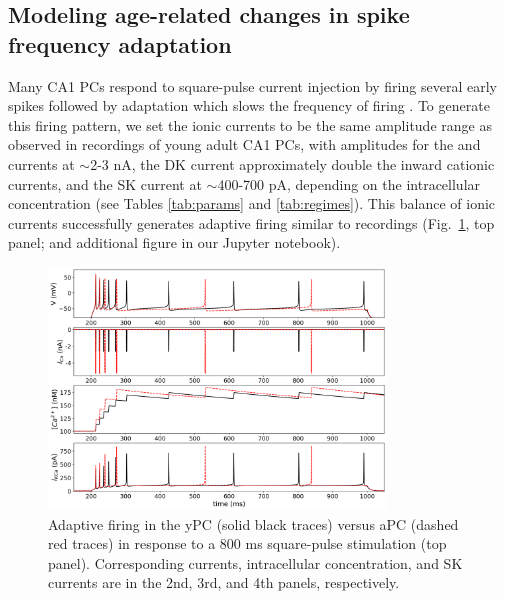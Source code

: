 \documentclass[12pt]{article}
\begin{document}
\subsection{Modeling age-related changes in spike frequency adaptation}
\label{sec:adaptation}

Many CA1 PCs respond to square-pulse current injection by firing several early spikes followed by adaptation which slows the frequency of firing \citep{gant2006early,gu2008sk,moyer1992nimodipine}. To generate this firing pattern, we set the ionic currents to be the same amplitude range as observed in recordings of young adult CA1 PCs, with amplitudes for the {\Na} and {\Ca} currents at $\sim$2-3 nA, the DK current approximately double the inward cationic currents, and the SK current at $\sim$400-700 pA, depending on the intracellular {\Ca} concentration (see Tables \ref{tab:params} and \ref{tab:regimes}). This balance of ionic currents successfully generates adaptive firing similar to recordings (Fig.~\ref{fig:adapt}, top panel; and additional figure in our Jupyter notebook).

\begin{figure}[h!]
\centering
\includegraphics[width=0.8\textwidth]{figures/fig1.png}
\caption{Adaptive firing in the yPC (solid black traces) versus aPC (dashed red traces) in response to a 800 ms square-pulse stimulation (top panel). Corresponding {\Ca} currents, intracellular {\Ca} concentration, and SK currents are in the 2nd, 3rd, and 4th panels, respectively.}
\label{fig:adapt}
\end{figure}
\end{document}
